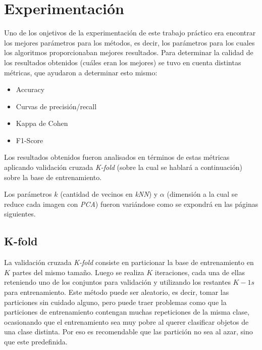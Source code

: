 \section{Experimentación}

Uno de los onjetivos de la experimentación de este trabajo práctico era encontrar los mejores parámetros para los métodos, es decir, los parámetros para los cuales los algoritmos proporcionaban mejores resultados. Para determinar la calidad de los resultados obtenidos (cuáles eran los mejores) se tuvo en cuenta distintas métricas, que ayudaron a determinar esto mismo:

\begin{itemize}
\item Accuracy
\item Curvas de precisión/recall
\item Kappa de Cohen
\item F1-Score
\end{itemize}

Los resultados obtenidos fueron analisados en términos de estas métricas aplicando validación cruzada \textit{K-fold} (sobre la cual se hablará a continuación) sobre la base de entrenamiento.

Los parámetros $k$ (cantidad de vecinos en \textit{kNN}) y $\alpha$ (dimensión a la cual se reduce cada imagen con \textit{PCA}) fueron variándose como se expondrá en las páginas siguientes.

\subsection{K-fold}

La validación cruzada \textit{K-fold} consiste en particionar la base de entrenamiento en $K$ partes del mismo tamaño. Luego se realiza $K$ iteraciones, cada una de ellas reteniendo uno de los conjuntos para validación y utilizando los restantes $K - 1s$ para entrenamiento. Este método puede ser aleatorio, es decir, tomar las particiones sin cuidado alguno, pero puede traer problemas como que la particiones de entrenamiento contengan muchas repeticiones de la misma clase, ocasionando que el entrenamiento sea muy pobre al querer clasificar objetos de una clase distinta. Por eso es recomendable que las partición no sea al azar, sino que este predefinida.
